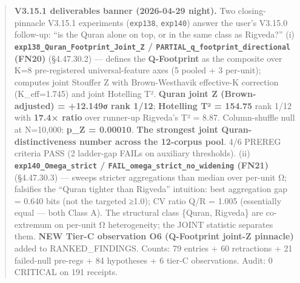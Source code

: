 \documentclass[
]{article}
\begin{document}
\begin{quote}
\textbf{V3.15.1 deliverables banner (2026-04-29 night).} Two
closing-pinnacle V3.15.1 experiments (\texttt{exp138}, \texttt{exp140})
answer the user's V3.15.0 follow-up: ``is the Quran alone on top, or in
the same class as Rigveda?'' (i)
\textbf{\texttt{exp138\_Quran\_Footprint\_Joint\_Z} /
\texttt{PARTIAL\_q\_footprint\_directional} (FN20)} (§4.47.30.2) ---
defines the \textbf{Q-Footprint} as the composite over K=8
pre-registered universal-feature axes (5 pooled + 3 per-unit); computes
joint Stouffer Z with Brown-Westhavik effective-K correction
(K\_eff=1.745) and joint Hotelling T². \textbf{Quran joint Z
(Brown-adjusted) = +12.149σ rank 1/12}; \textbf{Hotelling T² = 154.75}
rank 1/12 with \textbf{17.4× ratio} over runner-up Rigveda's T² = 8.87.
Column-shuffle null at N=10,000: \textbf{p\_Z = 0.00010}. \textbf{The
strongest joint Quran-distinctiveness number across the 12-corpus pool}.
4/6 PREREG criteria PASS (2 ladder-gap FAILs on auxiliary thresholds).
(ii) \textbf{\texttt{exp140\_Omega\_strict} /
\texttt{FAIL\_omega\_strict\_no\_widening} (FN21)} (§4.47.30.3) ---
sweeps stricter aggregations than median over per-unit Ω; falsifies the
``Quran tighter than Rigveda'' intuition: best aggregation gap = 0.640
bits (not the targeted ≥1.0); CV ratio Q/R = 1.005 (essentially equal
--- both Class A). The structural class \{Quran, Rigveda\} are
co-extremum on per-unit Ω heterogeneity; the JOINT statistic separates
them. \textbf{NEW Tier-C observation O6 (Q-Footprint joint-Z pinnacle)}
added to RANKED\_FINDINGS. Counts: 79 entries + 60 retractions + 21
failed-null pre-regs + 84 hypotheses + 6 tier-C observations. Audit: 0
CRITICAL on 191 receipts.
\end{quote}
\end{document}
